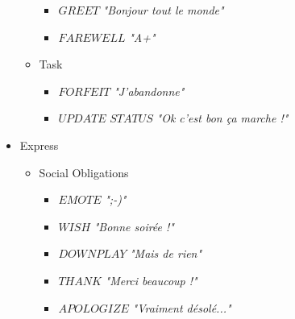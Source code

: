 \begin{itemize}
\begin{itemize}
\begin{itemize}
					\item $GREET$
						\newline \textit{"Bonjour tout le monde"}
					\item $FAREWELL$
						\newline \textit{"A+"}
				\end{itemize}
			\item Task
				\begin{itemize}
					\item $FORFEIT$
						\newline \textit{"J'abandonne"}
					\item $UPDATE$ $STATUS$
						\newline \textit{"Ok c'est bon ça marche !"}
				\end{itemize}
		\end{itemize}
	\item Express
		\begin{itemize}
			\item Social Obligations
				\begin{itemize}
					\item $EMOTE$
						\newline \textit{";-)"}
					\item $WISH$
						\newline \textit{"Bonne soirée !"}
					\item $DOWNPLAY$
						\newline \textit{"Mais de rien"}
					\item $THANK$
						\newline \textit{"Merci beaucoup !"}
					\item $APOLOGIZE$
						\newline \textit{"Vraiment désolé..."}
				\end{itemize}
		\end{itemize}
\end{itemize}